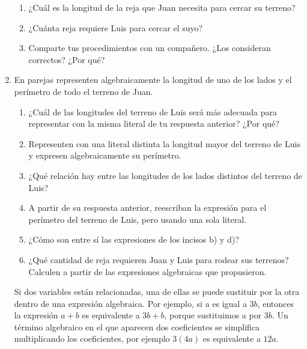 \documentclass[11pt]{book}
\begin{document}
\begin{enumerate}
        \begin{enumerate}
          \item ¿Cuál es la longitud de la reja que Juan necesita para cercar su terreno?
          \item ¿Cuánta reja requiere Luis para cercar el suyo?
          \item Comparte tus procedimientos con un compañero. ¿Los consideran correctos? ¿Por qué?
        \end{enumerate}
  \item En parejas representen algebraicamente la longitud de uno de los lados y el perímetro de todo el terreno de Juan.
        \begin{enumerate}
          \item ¿Cuál de las longitudes del terreno de Luis será más adecuada para representar con la misma literal de tu
                respuesta anterior? ¿Por qué?
          \item Representen con una literal distinta la longitud mayor del terreno de Luis y expresen algebraicamente su
                perímetro.
          \item ¿Qué relación hay entre las longitudes de los lados distintos del terreno de Luis?
          \item A partir de su respuesta anterior, reescriban la expresión para el perímetro del terreno de Luis,
                pero usando una sola literal.
          \item ¿Cómo son entre sí las expresiones de los incisos b) y d)?
          \item ¿Qué cantidad de reja requieren Juan y Luis para rodear sus terrenos? Calculen a partir de las
                expresiones algebraicas que propusieron.
        \end{enumerate}

        \begin{boxH}
          Si dos variables están relacionadas, una de ellas se puede sustituir por la otra dentro
          de una expresión algebraica. Por ejemplo, si a es igual a $3b$, entonces la expresión
          $a + b$ es equivalente a $3b + b$, porque sustituimos a por $3b$.
          Un término algebraico en el que aparecen dos coeficientes se simplifica multiplicando
          los coeficientes, por ejemplo $3(4a)$ es equivalente a $12a$.
        \end{boxH}


\end{enumerate}
\end{document}
